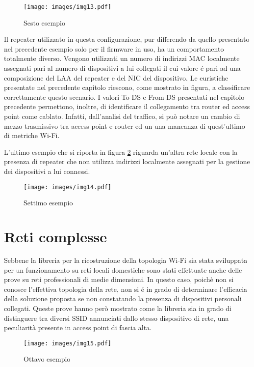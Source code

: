 \begin{figure}[!h]
	\centering
	\texttt{[image: images/img13.pdf]}
	\caption{Sesto esempio}
	\label{fig:es6}
\end{figure}

Il repeater utilizzato in questa configurazione, pur differendo da quello presentato nel precedente esempio solo per il firmware in uso, ha un comportamento totalmente diverso.
Vengono utilizzati un numero di indirizzi MAC localmente assegnati pari al numero di dispositivi a lui collegati il cui valore \'e pari ad una composizione del LAA del repeater e del NIC del dispositivo.
Le euristiche presentate nel precedente capitolo riescono, come mostrato in figura, a classificare correttamente questo scenario.
I valori To DS e From DS presentati nel capitolo precedente permettono, inoltre, di identificare il collegamento tra router ed access point come cablato.
Infatti, dall'analisi del traffico, si pu\`o notare un cambio di mezzo trasmissivo tra access point e router ed un una mancanza di quest'ultimo di metriche Wi-Fi.

L'ultimo esempio che si riporta in figura \ref{fig:es7} riguarda un'altra rete locale con la presenza di repeater che non utilizza indirizzi localmente assegnati per la gestione dei dispositivi a lui connessi.
  
\begin{figure}[!h]
	\centering
	\texttt{[image: images/img14.pdf]}
	\caption{Settimo esempio}
	\label{fig:es7}
\end{figure}

\section{Reti complesse}
Sebbene la libreria per la ricostruzione della topologia Wi-Fi sia stata sviluppata per un funzionamento su reti locali domestiche sono stati effettuate anche delle prove su reti professionali di medie dimensioni.
In questo caso, poich\`e non si conosce l'effettiva topologia della rete, non si \'e in grado di determinare l'efficacia della soluzione proposta se non constatando la presenza di dispositivi personali collegati.
Queste prove hanno per\`o mostrato come la libreria sia in grado di distinguere tra diversi SSID annunciati dallo stesso dispositivo di rete, una peculiarit\`a presente in access point di fascia alta.


\begin{figure}[!h]
	\centering
	\texttt{[image: images/img15.pdf]}
	\caption{Ottavo esempio}
	\label{fig:es8}
\end{figure}

